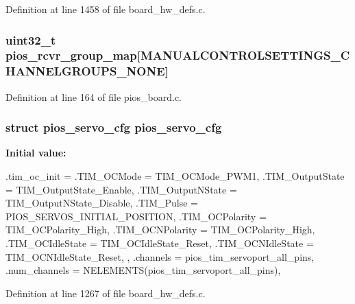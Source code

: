 \-Definition at line 1458 of file board\-\_\-hw\-\_\-defs.\-c.

\hypertarget{group___flying_f4_ga6c6cfc16eb738e47c123298e062297e2}{
\subsubsection[{pios\-\_\-rcvr\-\_\-group\-\_\-map}]{\setlength{\rightskip}{0pt plus 5cm}uint32\-\_\-t {\bf pios\-\_\-rcvr\-\_\-group\-\_\-map}\mbox{[}{\bf \-M\-A\-N\-U\-A\-L\-C\-O\-N\-T\-R\-O\-L\-S\-E\-T\-T\-I\-N\-G\-S\-\_\-\-C\-H\-A\-N\-N\-E\-L\-G\-R\-O\-U\-P\-S\-\_\-\-N\-O\-N\-E}\mbox{]}}}\label{group___flying_f4_ga6c6cfc16eb738e47c123298e062297e2}


\-Definition at line 164 of file pios\-\_\-board.\-c.

\hypertarget{group___flying_f4_ga57a87ef16d7949a9cc3589efc8d88a28}{
\subsubsection[{pios\-\_\-servo\-\_\-cfg}]{\setlength{\rightskip}{0pt plus 5cm}struct {\bf pios\-\_\-servo\-\_\-cfg} {\bf pios\-\_\-servo\-\_\-cfg}}}\label{group___flying_f4_ga57a87ef16d7949a9cc3589efc8d88a28}
{\bfseries \-Initial value\-:}
\begin{DoxyCode}
 {
        .tim_oc_init = {
                .TIM_OCMode = TIM_OCMode_PWM1,
                .TIM_OutputState = TIM_OutputState_Enable,
                .TIM_OutputNState = TIM_OutputNState_Disable,
                .TIM_Pulse = PIOS_SERVOS_INITIAL_POSITION,
                .TIM_OCPolarity = TIM_OCPolarity_High,
                .TIM_OCNPolarity = TIM_OCPolarity_High,
                .TIM_OCIdleState = TIM_OCIdleState_Reset,
                .TIM_OCNIdleState = TIM_OCNIdleState_Reset,
        },
        .channels = pios_tim_servoport_all_pins,
        .num_channels = NELEMENTS(pios_tim_servoport_all_pins),
}
\end{DoxyCode}


\-Definition at line 1267 of file board\-\_\-hw\-\_\-defs.\-c.

